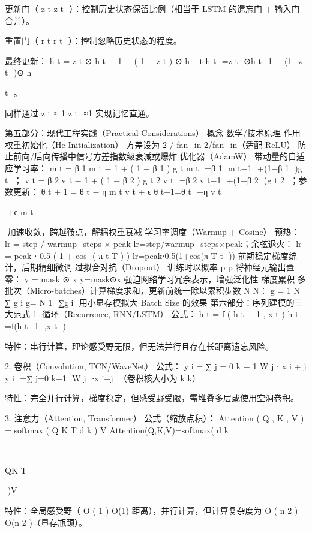 更新门（
z
t
z 
t
​
 ）：控制历史状态保留比例（相当于 LSTM 的遗忘门 + 输入门合并）。

重置门（
r
t
r 
t
​
 ）：控制忽略历史状态的程度。

最终更新：
h
t
=
z
t
⊙
h
t
−
1
+
(
1
−
z
t
)
⊙
h
~
t
h 
t
​
 =z 
t
​
 ⊙h 
t−1
​
 +(1−z 
t
​
 )⊙ 
h
~
  
t
​
 。

同样通过 
z
t
≈
1
z 
t
​
 ≈1 实现记忆直通。

第五部分：现代工程实践（Practical Considerations）
概念	数学/技术原理	作用
权重初始化（He Initialization）	方差设为 
2
/
fan_in
2/fan_in（适配 ReLU）	防止前向/后向传播中信号方差指数级衰减或爆炸
优化器（AdamW）	带动量的自适应学习率：
m
t
=
β
1
m
t
−
1
+
(
1
−
β
1
)
g
t
m 
t
​
 =β 
1
​
 m 
t−1
​
 +(1−β 
1
​
 )g 
t
​
 ；
v
t
=
β
2
v
t
−
1
+
(
1
−
β
2
)
g
t
2
v 
t
​
 =β 
2
​
 v 
t−1
​
 +(1−β 
2
​
 )g 
t
2
​
 ；参数更新：
θ
t
+
1
=
θ
t
−
η
m
t
v
t
+
ϵ
θ 
t+1
​
 =θ 
t
​
 −η 
v 
t
​
 
​
 +ϵ
m 
t
​
 
​
 	加速收敛，跨越鞍点，解耦权重衰减
学习率调度（Warmup + Cosine）	预热：
lr
=
step
/
warmup_steps
×
peak
lr=step/warmup_steps×peak；余弦退火：
lr
=
peak
⋅
0.5
(
1
+
cos
⁡
(
π
t
T
)
)
lr=peak⋅0.5(1+cos(π 
T
t
​
 ))	前期稳定梯度统计，后期精细微调
过拟合对抗（Dropout）	训练时以概率 
p
p 将神经元输出置零：
y
=
mask
⊙
x
y=mask⊙x	强迫网络学习冗余表示，增强泛化性
梯度累积	多批次（Micro-batches）计算梯度求和，更新前统一除以累积步数 
N
N：
g
=
1
N
∑
g
i
g= 
N
1
​
 ∑g 
i
​
 	用小显存模拟大 Batch Size 的效果
第六部分：序列建模的三大范式
1. 循环（Recurrence, RNN/LSTM）
公式：
h
t
=
f
(
h
t
−
1
,
x
t
)
h 
t
​
 =f(h 
t−1
​
 ,x 
t
​
 )

特性：串行计算，理论感受野无限，但无法并行且存在长距离遗忘风险。

2. 卷积（Convolution, TCN/WaveNet）
公式：
y
i
=
∑
j
=
0
k
−
1
W
j
⋅
x
i
+
j
y 
i
​
 =∑ 
j=0
k−1
​
 W 
j
​
 ⋅x 
i+j
​
 （卷积核大小为 
k
k）

特性：完全并行计算，梯度稳定，但感受野受限，需堆叠多层或使用空洞卷积。

3. 注意力（Attention, Transformer）
公式（缩放点积）：
Attention
(
Q
,
K
,
V
)
=
softmax
(
Q
K
T
d
k
)
V
Attention(Q,K,V)=softmax( 
d 
k
​
 
​
 
QK 
T
 
​
 )V

特性：全局感受野（
O
(
1
)
O(1) 距离），并行计算，但计算复杂度为 
O
(
n
2
)
O(n 
2
 )（显存瓶颈）。

